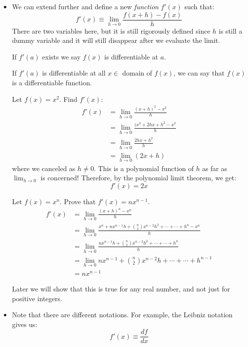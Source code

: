 \begin{itemize}
\begin{equation}
    \end{equation}
    \item We can extend further and define a new \textit{function} $f'(x)$ such that:
    \begin{equation}
        f'(x) \equiv \lim_{h\to 0} \frac{f(x+h)-f(x)}{h}
        \label{eq:}
    \end{equation}
    There are two variables here, but it is still rigorously defined since $h$ is still a dummy variable and it will still disappear after we evaluate the limit.
    \begin{definition}
        If $f'(a)$ exists we say $f(x)$ is differentiable at $a$.
    \end{definition}
    \begin{definition}
        If $f'(a)$ is differentiable at all $x\in $ domain of $f(x)$, we can say that $f(x)$ is a differentiable function.
    \end{definition}
    \begin{example}
        Let $f(x)=x^2$. Find $f'(x)$:
        \begin{align}
            f'(x) &= \lim_{h\to 0} \frac{(x+h)^2-x^2}{h} \\ 
            &= \lim_{h\to 0} \frac{(x^2+2hx+h^2-x^2}{h} \\ 
            &= \lim_{h\to 0} \frac{2hx+h^2}{h} \\ 
            &= \lim_{h\to 0} (2x+h)
        \end{align}
        where we canceled as $h\neq 0$. This is a polynomial function of $h$ as far as $\lim_{h\to 0}$ is concerned! Therefore, by the polynomial limit theorem, we get:
        \begin{equation}
            f'(x) = 2x
            \label{eq:}
        \end{equation}
    \end{example}
    \begin{example}
        Let $f(x)=x^n$. Prove that $f'(x)=nx^{n-1}$.
        \begin{align}
            f'(x) &= \lim_{h\to 0}\frac{(x+h)^n-x^n}{h} \\ 
            &= \lim_{h\to 0} \frac{x^n+nx^{n-1}h+\binom{n}{2}x^{n-2}h^2+\cdots + \cdots + h^n-x^n}{h} \\ 
            &=  \lim_{h\to 0} \frac{nx^{n-1}h+\binom{n}{2}x^{n-2}h^2+\cdots + \cdots + h^n}{h} \\ 
            &= \lim_{h\to 0} nx^{n-1}+\binom{n}{2}x^{n-2}h+\cdots + \cdots + h^{n-1} \\ 
            &= nx^{n-1}
        \end{align}
    \end{example}
    Later we will show that this is true for any real number, and not just for positive integers.
    \item Note that there are different notations. For example, the Leibniz notation gives us:
    \begin{equation}
        f'(x) \equiv \frac{df}{dx}
        \label{eq:}
    \end{equation}
    
\end{itemize}

